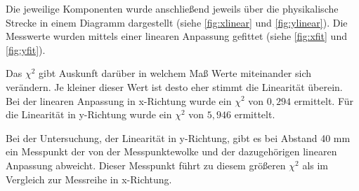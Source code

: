 Die jeweilige Komponenten wurde anschließend jeweils über die physikalische Strecke in einem Diagramm dargestellt (siehe \cref{fig:xlinear} und \cref{fig:ylinear}).
Die Messwerte wurden mittels einer linearen Anpassung gefittet (siehe \cref{fig:xfit} und \cref{fig:yfit}).

Das \(\chi^2\) gibt Auskunft darüber in welchem Maß Werte miteinander sich verändern.
Je kleiner dieser Wert ist desto eher stimmt die Linearität überein.
Bei der linearen Anpassung in x-Richtung wurde ein \(\chi^2\) von \(0,294\) ermittelt.
Für die Linearität in y-Richtung wurde ein \(\chi^2\) von \(5,946\) ermittelt.

Bei der Untersuchung, der Linearität in y-Richtung, gibt es bei Abstand 40 mm ein Messpunkt der von der Messpunktewolke und der dazugehörigen linearen Anpassung abweicht. Dieser Messpunkt führt zu diesem größeren \(\chi^2\) als im Vergleich zur Messreihe  in x-Richtung.


